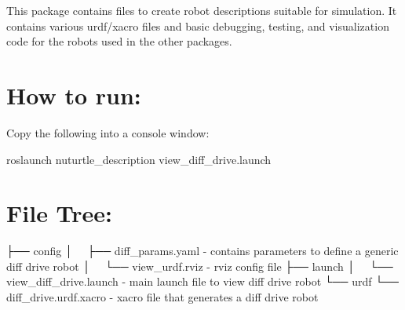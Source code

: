 This package contains files to create robot descriptions suitable for simulation. It contains various urdf/xacro files and basic debugging, testing, and visualization code for the robots used in the other packages.

\section*{How to run\+:}

Copy the following into a console window\+:  
\begin{DoxyCode}
roslaunch nuturtle\_description view\_diff\_drive.launch
\end{DoxyCode}


\section*{File Tree\+:}


\begin{DoxyCode}
├── config
│   ├── diff\_params.yaml - contains parameters to define a generic diff drive robot
│   └── view\_urdf.rviz - rviz config file
├── launch
│   └── view\_diff\_drive.launch - main launch file to view diff drive robot
└── urdf
    └── diff\_drive.urdf.xacro - xacro file that generates a diff drive robot
\end{DoxyCode}
 